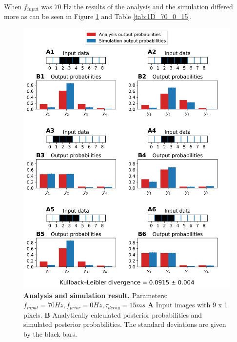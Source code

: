 When $f_{input}$ was 70 Hz the results of the analysis and the simulation differed more as can be seen in Figure \ref{fig:1D_70_0_15} and Table \ref{tab:1D_70_0_15}.

\begin{figure}
  \includegraphics[width=\linewidth]{figures/1D/1D_70_0_15.png}
    \caption{\textbf{Analysis and simulation result. } Parameters: $f_{input} = 70 Hz, f_{prior} = 0 Hz, \tau_{decay} = 15 ms$ \textbf{A} Input images with 9 x 1 pixels. \textbf{B} Analytically calculated posterior probabilities and simulated posterior probabilities. The standard deviations are given by the black bars.}
  \label{fig:1D_70_0_15}
\end{figure}

